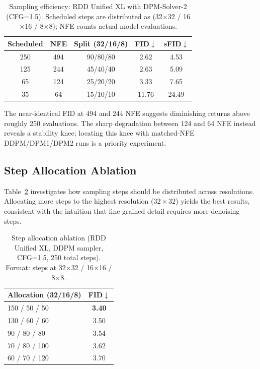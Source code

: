 \documentclass[10pt]{article}
\begin{document}
\begin{table}[t]
\centering
\caption{Sampling efficiency: RDD Unified XL with DPM-Solver-2 (CFG=1.5). Scheduled steps are distributed as (32$\times$32 / 16$\times$16 / 8$\times$8); NFE counts actual model evaluations.}
\label{tab:nfe}
\begin{tabular}{@{}ccccc@{}}
\toprule
\textbf{Scheduled} & \textbf{NFE} & \textbf{Split (32/16/8)} & \textbf{FID}$\downarrow$ & \textbf{sFID}$\downarrow$ \\
\midrule
250 & 494 & 90/80/80 & 2.62 & 4.53 \\
125 & 244 & 45/40/40 & 2.63 & 5.09 \\
65 & 124 & 25/20/20 & 3.33 & 7.65 \\
35 & 64 & 15/10/10 & 11.76 & 24.49 \\
\bottomrule
\end{tabular}
\end{table}

The near-identical FID at 494 and 244 NFE suggests diminishing returns above roughly 250 evaluations.
The sharp degradation between 124 and 64 NFE instead reveals a stability knee; locating this knee with matched-NFE DDPM/DPM1/DPM2 runs is a priority experiment.

\subsection{Step Allocation Ablation}
\label{sec:step_alloc}

Table~\ref{tab:step_alloc} investigates how sampling steps should be distributed across resolutions.
Allocating more steps to the highest resolution ($32\times32$) yields the best results, consistent with the intuition that fine-grained detail requires more denoising steps.

\begin{table}[t]
\centering
\caption{Step allocation ablation (RDD Unified XL, DDPM sampler, CFG=1.5, 250 total steps). Format: steps at 32$\times$32 / 16$\times$16 / 8$\times$8.}
\label{tab:step_alloc}
\begin{tabular}{@{}lc@{}}
\toprule
\textbf{Allocation (32/16/8)} & \textbf{FID}$\downarrow$ \\
\midrule
150 / 50 / 50 & \textbf{3.40} \\
130 / 60 / 60 & 3.50 \\
90 / 80 / 80 & 3.54 \\
70 / 80 / 100 & 3.62 \\
60 / 70 / 120 & 3.70 \\
\bottomrule
\end{tabular}
\end{table}
\end{document}
